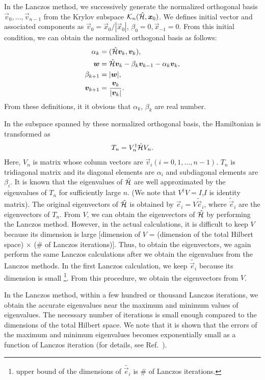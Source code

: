 In the Lanczos method,
we successively generate the normalized orthogonal basis 
${\vec{v}_{0},\dots,\vec{v}_{n-1}}$ from the Krylov subspace $\mathcal{K}_{n}(\hat{\mathcal{H}},\boldsymbol x_{0})$.
We defines initial vector and associated components as 
$\vec{v}_{0} =\vec{x}_{0}/|\vec{x}_{0}|$,
$\beta_{0}=0,\vec{x}_{-1}=0$.
From this initial condition,
we can obtain the normalized orthogonal basis  as follows:
\begin{align}
\alpha_{k} &= (\hat{\mathcal{H}}\boldsymbol v_{k},\boldsymbol v_{k}), \\
\boldsymbol w   &= \hat{\mathcal{H}}\boldsymbol v_{k}-\beta_{k}\boldsymbol v_{k-1}-\alpha_{k}\boldsymbol v_{k}, \\
\beta_{k+1} &= |\boldsymbol w|, \\
\boldsymbol v_{k+1} &= \frac{\boldsymbol v_{k}}{|\boldsymbol v_{k}|}. \label{eq: LanczosVector}
\end{align}
From these definitions, it it obvious that $\alpha_{k}$, $\beta_{k}$ are real number.

In the subspace spanned by these normalized orthogonal basis,
the Hamiltonian is transformed as
\begin{align}
T_{n}=V_{n}^{\dagger}\hat{\mathcal{H}} V_{n}.
\end{align}
Here,
$V_{n}$ is matrix whose column vectors are 
$\vec{v}_{i}(i=0,1,\dots,n-1)$.
$T_{n}$ is tridiagonal matrix and its diagonal elements
are $\alpha_{i}$ and
subdiagonal elements are $\beta_{i}$.
It is known that
the eigenvalues of $\hat{\mathcal{H}}$ are well approximated by 
the eigenvalues of $T_{n}$ for sufficiently large $n$.
(We note that $V^{\dagger}V=I$,$I$ is identity matrix).
The original eigenvectors of $\hat{\mathcal{H}}$ is obtained 
by $\vec{e}_{i}=V\tilde{\vec{e}}_{i}$,
where  $\tilde{\vec{e}}_{i}$ are
the eigenvectors of $T_{n}$.
From $V$, 
we can obtain the eigenvectors of $\hat{\mathcal{H}}$
by performing the Lanczos method.
However, in the actual calculations,
it is difficult to keep $V$ because its dimension
is large [dimension of $V$ = (dimension of the total Hilbert space) $\times$ ($\#$ of Lanczos iterations)].
Thus, to obtain the eigenvectors, 
we again perform the same Lanczos calculations
after we obtain the eigenvalues from the Lanczos methods.
In the first Lanczos calculation, we keep $\tilde{\vec{e}_{i}}$
because its dimension is small
\footnote{upper bound of the dimensions of $\tilde{\vec{e}_{i}}$ is $\#$ of Lanczos iterations.}.
From this procedure, we obtain the eigenvectors  from $V$.

In the Lanczos method,
within a few hundred or thousand Lanczos iterations,
we obtain the accurate eigenvalues near the maximum and minimum values of eigenvalues.
The necessary number of iterations is small enough 
compared to the dimensions
of the total Hilbert space.
We note that it is shown that
the errors of the maximum and minimum eigenvalues
becomes exponentially small as a function of Lanczos iteration 
(for details, see Ref.~\cite{SugiharaMurota_en}).

